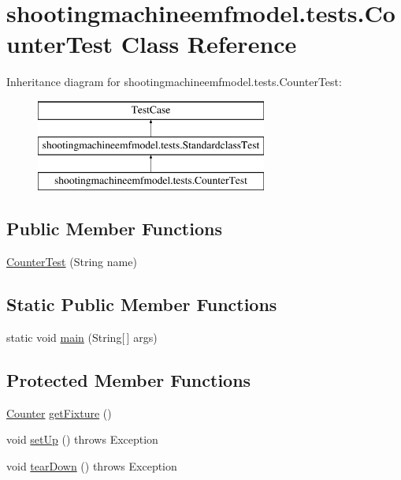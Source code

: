 \hypertarget{classshootingmachineemfmodel_1_1tests_1_1_counter_test}{\section{shootingmachineemfmodel.\-tests.\-Counter\-Test Class Reference}
\label{classshootingmachineemfmodel_1_1tests_1_1_counter_test}
}
Inheritance diagram for shootingmachineemfmodel.\-tests.\-Counter\-Test\-:\begin{figure}[H]
\begin{center}
\leavevmode
\includegraphics[height=3.000000cm]{classshootingmachineemfmodel_1_1tests_1_1_counter_test}
\end{center}
\end{figure}
\subsection*{Public Member Functions}
\begin{DoxyCompactItemize}
\item 
\hyperlink{classshootingmachineemfmodel_1_1tests_1_1_counter_test_a9111203dc73f68c46807635749bb3787}{Counter\-Test} (String name)
\end{DoxyCompactItemize}
\subsection*{Static Public Member Functions}
\begin{DoxyCompactItemize}
\item 
static void \hyperlink{classshootingmachineemfmodel_1_1tests_1_1_counter_test_a2bc3b9e98ddab85b6a5eae8203c6a254}{main} (String\mbox{[}$\,$\mbox{]} args)
\end{DoxyCompactItemize}
\subsection*{Protected Member Functions}
\begin{DoxyCompactItemize}
\item 
\hyperlink{interfaceshootingmachineemfmodel_1_1_counter}{Counter} \hyperlink{classshootingmachineemfmodel_1_1tests_1_1_counter_test_a2c6d7433f8736f1359b7ed2966b1ea6f}{get\-Fixture} ()
\item 
void \hyperlink{classshootingmachineemfmodel_1_1tests_1_1_counter_test_a7b0997b8af204edf92679bfac1b57da3}{set\-Up} ()  throws Exception 
\item 
void \hyperlink{classshootingmachineemfmodel_1_1tests_1_1_counter_test_a61b535c1d3cb5cf488c0c089323b3c2f}{tear\-Down} ()  throws Exception 
\end{DoxyCompactItemize}
